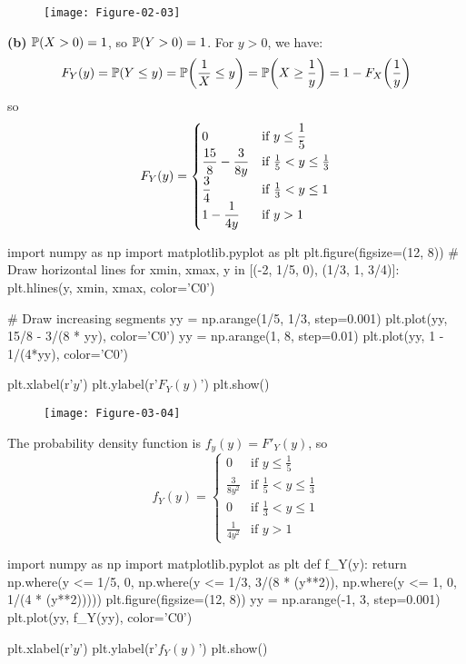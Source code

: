 \begin{figure}[H]
\centering
\texttt{[image: Figure-02-03]}
\end{figure}

\textbf{(b)}
\(\operatorname{\mathbb{P}}(X > 0) = 1\), so \(\operatorname{\mathbb{P}}(Y > 0) = 1\). For \(y > 0\),
we have:
\[
F_Y(y) = \PROB(Y \leq y) 
= \PROB\left(\frac{1}{X} \leq y\right) 
= \PROB\left(X \geq \frac{1}{y}\right) 
= 1 - F_X\left(\frac{1}{y} \right)
\]
so
\[
F_Y(y) = 
\begin{cases}
0 
&\text{if } y \leq \displaystyle\frac{1}{5} \\
\displaystyle\frac{15}{8} - \frac{3}{8y} 
&\text{if } \frac{1}{5} < y \leq \frac{1}{3} \\
\displaystyle\frac{3}{4} 
&\text{if } \frac{1}{3} < y \leq 1 \\
1 - \displaystyle\frac{1}{4y} 
&\text{if } y > 1
\end{cases}
\]

\begin{python}
import numpy as np
import matplotlib.pyplot as plt
plt.figure(figsize=(12, 8))
# Draw horizontal lines
for xmin, xmax, y in [(-2, 1/5, 0), (1/3, 1, 3/4)]:
    plt.hlines(y, xmin, xmax, color='C0')
    
# Draw increasing segments
yy = np.arange(1/5, 1/3, step=0.001)
plt.plot(yy, 15/8 - 3/(8 * yy), color='C0')
yy = np.arange(1, 8, step=0.01)
plt.plot(yy, 1 - 1/(4*yy), color='C0')
    
plt.xlabel(r'$y$')
plt.ylabel(r'$F_Y(y)$')
plt.show()
\end{python}

\begin{figure}[H]
\centering
\texttt{[image: Figure-03-04]}
\end{figure}

The probability density function is \(f_y(y) = F'_Y(y)\), so
\[
f_Y(y) = 
\begin{cases}
0
&\text{if } y \leq \frac{1}{5} \\
\frac{3}{8y^{2}} 
&\text{if } \frac{1}{5} < y \leq \frac{1}{3} \\
0 
&\text{if } \frac{1}{3} < y \leq 1 \\
\frac{1}{4y^{2}} 
&\text{if } y > 1
\end{cases}
\]

\begin{python}
import numpy as np
import matplotlib.pyplot as plt
def f_Y(y):
    return np.where(y <= 1/5, 0, np.where(y <= 1/3, 3/(8 * (y**2)), 
                    np.where(y <= 1, 0, 1/(4 * (y**2)))))
plt.figure(figsize=(12, 8))
yy = np.arange(-1, 3, step=0.001)
plt.plot(yy, f_Y(yy), color='C0')
    
plt.xlabel(r'$y$')
plt.ylabel(r'$f_Y(y)$')
plt.show()
\end{python}

